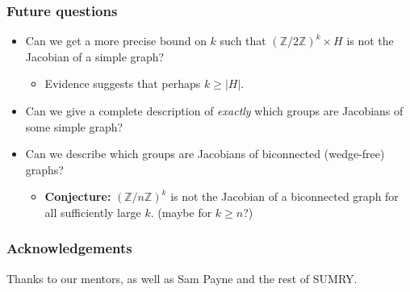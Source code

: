 \documentclass[mathserif, serif, xcolor=dvipsnames]{beamer}
\newcommand{\Z}{\ensuremath{\mathbb{Z}}}
\begin{document}
\begin{frame}
  \frametitle{Future questions}
  \begin{itemize}
    \item Can we get a more precise bound on $k$ such that $(\Z/2\Z)^k\times H$ is not the Jacobian of a simple graph?
    \medskip
      \pause
      \begin{itemize}
      \item Evidence suggests that perhaps $k\ge|H|$. 
      \end{itemize}
      \medskip
      \pause
    \item Can we give a complete description of \emph{exactly} which
      groups are Jacobians of some simple graph?
      \medskip
      \pause
    \item Can we describe which groups are Jacobians of biconnected (wedge-free)
      graphs?
      \medskip
      \pause
      \begin{itemize}
      \item \textbf{Conjecture:} $(\Z/n\Z)^k$ is not the Jacobian of a biconnected graph for all sufficiently large $k$. (maybe for $k\ge n$?)
      \end{itemize}
  \end{itemize}
\end{frame}

\begin{frame}
  \frametitle{Acknowledgements}

  Thanks to our mentors, as well as Sam Payne and the rest of
  SUMRY.
  
\end{frame}

\end{document}
